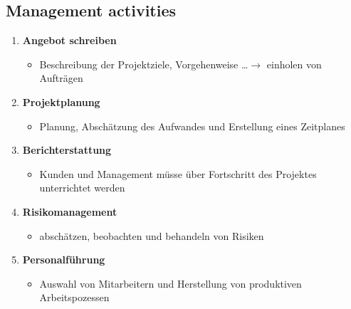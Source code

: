 \subsection{Management activities}
\begin{enumerate}
    \item \textbf{Angebot schreiben}
    \begin{itemize}
        \item Beschreibung der Projektziele, Vorgehenweise \dots $\rightarrow$ einholen von Aufträgen
    \end{itemize}
    \item \textbf{Projektplanung}
    \begin{itemize}
        \item Planung, Abschätzung des Aufwandes und Erstellung eines Zeitplanes
    \end{itemize}
    \item \textbf{Berichterstattung}
    \begin{itemize}
        \item Kunden und Management müsse über Fortschritt des Projektes unterrichtet werden
     \end{itemize}
     \item \textbf{Risikomanagement}
     \begin{itemize}
        \item abschätzen, beobachten und behandeln von Risiken
    \end{itemize}
    \item \textbf{Personalführung}
    \begin{itemize}
        \item Auswahl von Mitarbeitern und Herstellung von produktiven Arbeitspozessen
    \end{itemize}
\end{enumerate}


